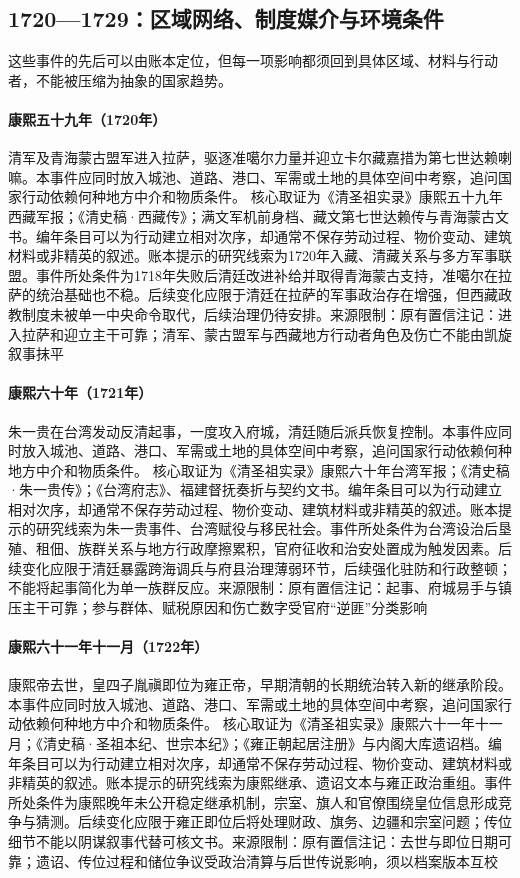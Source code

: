 \subsection{1720—1729：区域网络、制度媒介与环境条件}
这些事件的先后可以由账本定位，但每一项影响都须回到具体区域、材料与行动者，不能被压缩为抽象的国家趋势。
\hypertarget{civic:EQ-1720-LHASA-RESTORATION}{}\paragraph{康熙五十九年（1720年）}清军及青海蒙古盟军进入拉萨，驱逐准噶尔力量并迎立卡尔藏嘉措为第七世达赖喇嘛。本事件应同时放入城池、道路、港口、军需或土地的具体空间中考察，追问国家行动依赖何种地方中介和物质条件。 核心取证为《清圣祖实录》康熙五十九年西藏军报；《清史稿·西藏传》；满文军机前身档、藏文第七世达赖传与青海蒙古文书。编年条目可以为行动建立相对次序，却通常不保存劳动过程、物价变动、建筑材料或非精英的叙述。账本提示的研究线索为1720年入藏、清藏关系与多方军事联盟。事件所处条件为1718年失败后清廷改进补给并取得青海蒙古支持，准噶尔在拉萨的统治基础也不稳。后续变化应限于清廷在拉萨的军事政治存在增强，但西藏政教制度未被单一中央命令取代，后续治理仍待安排。来源限制：原有置信注记：进入拉萨和迎立主干可靠；清军、蒙古盟军与西藏地方行动者角色及伤亡不能由凯旋叙事抹平
\hypertarget{civic:EQ-1721-ZHU-YIGUI}{}\paragraph{康熙六十年（1721年）}朱一贵在台湾发动反清起事，一度攻入府城，清廷随后派兵恢复控制。本事件应同时放入城池、道路、港口、军需或土地的具体空间中考察，追问国家行动依赖何种地方中介和物质条件。 核心取证为《清圣祖实录》康熙六十年台湾军报；《清史稿·朱一贵传》；《台湾府志》、福建督抚奏折与契约文书。编年条目可以为行动建立相对次序，却通常不保存劳动过程、物价变动、建筑材料或非精英的叙述。账本提示的研究线索为朱一贵事件、台湾赋役与移民社会。事件所处条件为台湾设治后垦殖、租佃、族群关系与地方行政摩擦累积，官府征收和治安处置成为触发因素。后续变化应限于清廷暴露跨海调兵与府县治理薄弱环节，后续强化驻防和行政整顿；不能将起事简化为单一族群反应。来源限制：原有置信注记：起事、府城易手与镇压主干可靠；参与群体、赋税原因和伤亡数字受官府“逆匪”分类影响
\hypertarget{civic:EQ-1722-KANGXI-DEATH}{}\paragraph{康熙六十一年十一月（1722年）}康熙帝去世，皇四子胤禛即位为雍正帝，早期清朝的长期统治转入新的继承阶段。本事件应同时放入城池、道路、港口、军需或土地的具体空间中考察，追问国家行动依赖何种地方中介和物质条件。 核心取证为《清圣祖实录》康熙六十一年十一月；《清史稿·圣祖本纪、世宗本纪》；《雍正朝起居注册》与内阁大库遗诏档。编年条目可以为行动建立相对次序，却通常不保存劳动过程、物价变动、建筑材料或非精英的叙述。账本提示的研究线索为康熙继承、遗诏文本与雍正政治重组。事件所处条件为康熙晚年未公开稳定继承机制，宗室、旗人和官僚围绕皇位信息形成竞争与猜测。后续变化应限于雍正即位后将处理财政、旗务、边疆和宗室问题；传位细节不能以阴谋叙事代替可核文书。来源限制：原有置信注记：去世与即位日期可靠；遗诏、传位过程和储位争议受政治清算与后世传说影响，须以档案版本互校
